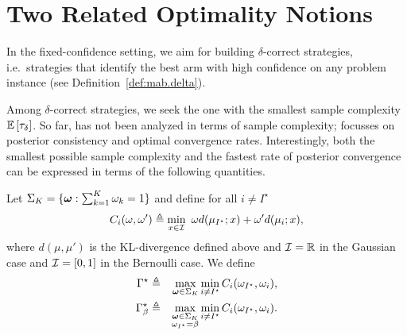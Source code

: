 \section{Two Related Optimality Notions}\label{sec:related}

In the fixed-confidence setting, we aim for building $\delta$-correct strategies, i.e.\ strategies that identify the best arm with high confidence on any problem instance (see Definition~\ref{def:mab.delta}). 


Among $\delta$-correct strategies, we seek the one with the smallest sample complexity $\mathbb{E}\left[\tau_\delta\right]$. So far, \TTTS has not been analyzed in terms of sample complexity; \citet{russo2016ttts} focusses on posterior consistency and optimal convergence rates. Interestingly, both the smallest possible sample complexity and the fastest rate of posterior convergence can be expressed in terms of the following quantities.





\begin{definition} Let $\Sigma_K = \{{\boldsymbol \omega} : \sum_{k=1}^K \omega_k = 1\}$ and define for all $i\neq I^\star$
\[
    C_i(\omega,\omega') \triangleq \min_{x\in \mathcal{I}} \ \omega d(\mu_{I^\star};x) + \omega' d(\mu_i;x),
\]
where $d(\mu,\mu')$ is the KL-divergence defined above and $\mathcal{I} = \mathbb{R}$ in the Gaussian case and $\mathcal{I} = [0,1]$ in the Bernoulli case. We define
\begin{eqnarray}
    \Gamma^\star &\triangleq& \max_{{\boldsymbol \omega} \in \Sigma_K}\min_{i\neq I^\star} C_i(\omega_{I^\star},\omega_i),\nonumber\\
    \Gamma_{\beta}^\star &\triangleq& \max_{\substack{{\boldsymbol \omega} \in \Sigma_K\\\omega_{I^\star}=\beta}}\min_{i\neq I^\star} C_i(\omega_{I^\star},\omega_i).\label{def:GammaBeta}\end{eqnarray}
\end{definition}

